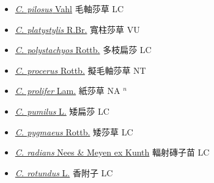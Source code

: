 \begin{itemize}
\begin{itemize}
        \item[] \href{http://www.theplantlist.org/tpl1.1/search?q=Cyperus+pilosus}{\textit{C. pilosus} Vahl}   毛軸莎草 LC
        \item[] \href{http://www.theplantlist.org/tpl1.1/search?q=Cyperus+platystylis}{\textit{C. platystylis} R.Br.}   寬柱莎草 VU
        \item[] \href{http://www.theplantlist.org/tpl1.1/search?q=Cyperus+polystachyos}{\textit{C. polystachyos} Rottb.}     多枝扁莎 LC
        \item[] \href{http://www.theplantlist.org/tpl1.1/search?q=Cyperus+procerus}{\textit{C. procerus} Rottb.}   擬毛軸莎草 NT
        \item[] \href{http://www.theplantlist.org/tpl1.1/search?q=Cyperus+prolifer}{\textit{C. prolifer} Lam.}   紙莎草 NA $^n$
        \item[] \href{http://www.theplantlist.org/tpl1.1/search?q=Cyperus+pumilus}{\textit{C. pumilus} L.}     矮扁莎 LC
        \item[] \href{http://www.theplantlist.org/tpl1.1/search?q=Cyperus+pygmaeus}{\textit{C. pygmaeus} Rottb.}   矮莎草 LC
        \item[] \href{http://www.theplantlist.org/tpl1.1/search?q=Cyperus+radians}{\textit{C. radians} Nees \& Meyen ex Kunth}     輻射磚子苗 LC
        \item[] \href{http://www.theplantlist.org/tpl1.1/search?q=Cyperus+rotundus}{\textit{C. rotundus} L.}   香附子 LC

\end{itemize}
\end{itemize}
